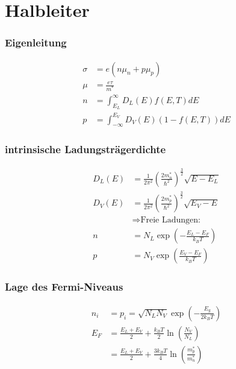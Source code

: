 \section{Halbleiter}

\subsubsection*{Eigenleitung}
\begin{equation*}
    \begin{aligned}
        \sigma &= e (n \mu_n + p \mu_p) \\
        \mu &= \frac{e \tau}{m^*} \\
        n &= \int_{E_L}^\infty D_L(E) f(E,T) dE \\
        p &= \int_{-\infty}^{E_V} D_V(E) (1-f(E,T)) dE
    \end{aligned}
\end{equation*}

\subsubsection*{intrinsische Ladungsträgerdichte}
\begin{equation*}
    \begin{aligned}
        D_L(E) &= \frac{1}{2 \pi^2} \left(\frac{2 m_n^*}{\hbar^2}\right)^{\frac{3}{2}} \sqrt{E-E_L} \\
        D_V(E) &= \frac{1}{2 \pi^2} \left(\frac{2 m_p^*}{\hbar^2}\right)^{\frac{3}{2}} \sqrt{E_V-E} \\
        & \Rightarrow \text{Freie Ladungen:}\\
        n &= N_L \exp\left(-\frac{E_L-E_F}{k_B T}\right) \\
        p &= N_V \exp\left(\frac{E_V - E_F}{k_B T}\right)
    \end{aligned}
\end{equation*}

\subsubsection*{Lage des Fermi-Niveaus}
\begin{equation*}
    \begin{aligned}
        n_i &= p_i = \sqrt{N_L N_V} \exp \left(- \frac{E_g}{2 k_B T}\right) \\
        E_F &= \frac{E_L + E_V}{2} + \frac{k_B T}{2} \ln \left(\frac{N_V}{N_L}\right) \\
            &= \frac{E_L + E_V}{2} + \frac{3 k_B T}{4} \ln \left(\frac{m_p^*}{m_n^*}\right)
    \end{aligned}
\end{equation*}

